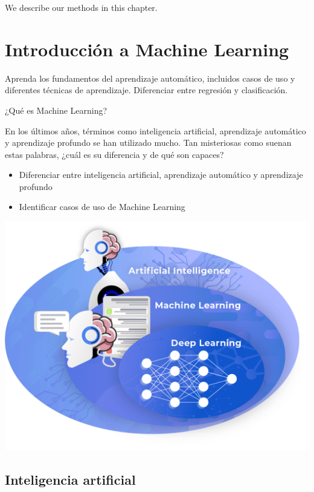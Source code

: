 \documentclass[
]{book}
\providecommand{\tightlist}{%
  \setlength{\itemsep}{0pt}\setlength{\parskip}{0pt}}
\begin{document}
We describe our methods in this chapter.

\hypertarget{introducciuxf3n-a-machine-learning}{%
\chapter{Introducción a Machine Learning}\label{introducciuxf3n-a-machine-learning}}

Aprenda los fundamentos del aprendizaje automático, incluidos casos de uso y diferentes técnicas de aprendizaje. Diferenciar entre regresión y clasificación.

¿Qué es Machine Learning?

En los últimos años, términos como inteligencia artificial, aprendizaje automático y aprendizaje profundo se han utilizado mucho. Tan misteriosas como suenan estas palabras, ¿cuál es su diferencia y de qué son capaces?

\begin{itemize}
\tightlist
\item
  Diferenciar entre inteligencia artificial, aprendizaje automático y aprendizaje profundo
\item
  Identificar casos de uso de Machine Learning
\end{itemize}

\includegraphics{img/int.png}

\hypertarget{inteligencia-artificial}{%
\section{Inteligencia artificial}\label{inteligencia-artificial}}
\end{document}
